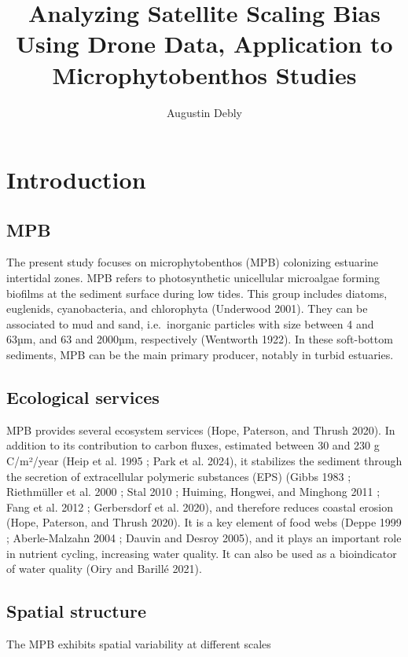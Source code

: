 \documentclass[
  letterpaper,
  DIV=11,
  numbers=noendperiod]{scrartcl}
\title{Analyzing Satellite Scaling Bias Using Drone Data, Application to
Microphytobenthos Studies}
\author{Augustin Debly}
\date{}
\begin{document}
\maketitle

\section{Introduction}\label{introduction}

\subsection{MPB}\label{mpb}

The present study focuses on microphytobenthos (MPB) colonizing
estuarine intertidal zones. MPB refers to photosynthetic unicellular
microalgae forming biofilms at the sediment surface during low tides.
This group includes diatoms, euglenids, cyanobacteria, and chlorophyta
(Underwood 2001). They can be associated to mud and sand, i.e.~inorganic
particles with size between 4 and 63µm, and 63 and 2000µm, respectively
(Wentworth 1922). In these soft-bottom sediments, MPB can be the main
primary producer, notably in turbid estuaries.

\subsection{Ecological services}\label{ecological-services}

MPB provides several ecosystem services (Hope, Paterson, and Thrush
2020). In addition to its contribution to carbon fluxes, estimated
between 30 and 230 g C/m²/year (Heip et al. 1995 ; Park et al. 2024), it
stabilizes the sediment through the secretion of extracellular polymeric
substances (EPS) (Gibbs 1983 ; Riethmüller et al. 2000 ; Stal 2010 ;
Huiming, Hongwei, and Minghong 2011 ; Fang et al. 2012 ; Gerbersdorf et
al. 2020), and therefore reduces coastal erosion (Hope, Paterson, and
Thrush 2020). It is a key element of food webs (Deppe 1999 ;
Aberle-Malzahn 2004 ; Dauvin and Desroy 2005), and it plays an important
role in nutrient cycling, increasing water quality. It can also be used
as a bioindicator of water quality (Oiry and Barillé 2021).

\subsection{Spatial structure}\label{spatial-structure}

The MPB exhibits spatial variability at different scales
\end{document}
